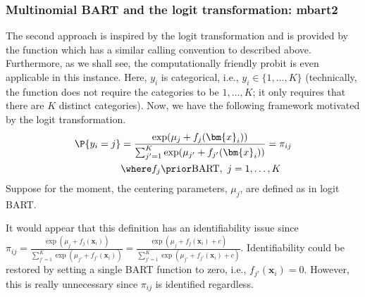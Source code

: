 \documentclass[article]{jss}
\begin{document}
\subsubsection{Multinomial BART and the logit transformation: mbart2}

The second approach is inspired by the logit transformation and is
provided by the  function which has a similar calling
convention to  described above.  Furthermore, as we shall
see, the computationally friendly probit is even applicable in this
instance.  Here, $y_i$ is categorical, i.e., $y_i \in \{1, \dots, K\}$
(technically, the  function does not require the
categories to be $1, \dots, K$; it only requires that there are $K$
distinct categories).  Now, we have the following framework motivated
by the logit transformation.
\begin{align*}
\P{y_i=j} & = \frac{\exp(\mu_j + f_j(\bm{x}_i))}
{\sum_{j'=1}^K \exp(\mu_{j'}+ f_{j'}(\bm{x}_i))} 
= \pi_{ij} \\
& \where f_j \prior \mathrm{BART},\ j=1, \dots, K
\end{align*}
Suppose for the moment, the centering parameters, $\mu_j$, are defined
as in logit BART.

It would appear that this definition has an identifiability issue
since
$\pi_{ij}= \frac{\exp(\mu_j + f_j(\bm{x}_i))} {\sum_{j'=1}^K
  \exp(\mu_{j'}+ f_{j'}(\bm{x}_i))} = \frac{\exp(\mu_j + f_j(\bm{x}_i)
  + c)} {\sum_{j'=1}^K \exp(\mu_{j'}+ f_{j'}(\bm{x}_i) + c)}$.
Identifiability could be restored by setting a single BART function to
zero, i.e., $f_{j'}(\bm{x}_i)=0$.  However, this is really unnecessary
since $\pi_{ij}$ is identified regardless.  %
\end{document}
